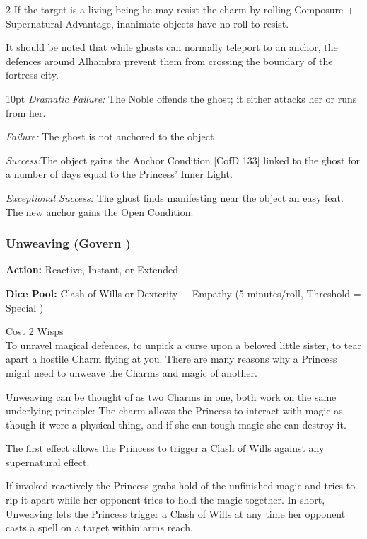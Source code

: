 \begin{multicols}{2}
If the target is a living being he may resist the charm by rolling Composure + Supernatural Advantage, inanimate objects have no roll to resist. 

It should be noted that while ghosts can normally teleport to an anchor, the defences around Alhambra prevent them from crossing the boundary of the fortress city.


\begin{myindentpar}{10pt} \emph{Dramatic Failure:} The Noble offends the ghost; it either attacks her or runs from her.

\emph{Failure:} The ghost is not anchored to the object

\emph{Success:}The object gains the Anchor Condition [CofD 133] linked to the ghost for a number of days equal to the Princess’ Inner Light.

\emph{Exceptional Success:}	 The ghost finds manifesting near the object an easy feat. The new anchor gains the Open Condition.

\end{myindentpar}

\subsubsection*{Unweaving (Govern \textbullet\textbullet\textbullet\textbullet)}

\noindent \textbf{Action:} Reactive, Instant, or Extended

\noindent \textbf{Dice Pool:} Clash of Wills or Dexterity + Empathy (5 minutes/roll, Threshold = Special )

\noindent Cost 2 Wisps\\

To unravel magical defences, to unpick a curse upon a beloved little sister, to tear apart a hostile Charm flying at you. There are many reasons why a Princess might need to unweave the Charms and magic of another. 

Unweaving can be thought of as two Charms in one, both work on the same underlying principle: The charm allows the Princess to interact with magic as though it were a physical thing, and if she can tough magic she can destroy it.

The first effect allows the Princess to trigger a Clash of Wills against any supernatural effect. 

If invoked reactively the Princess grabs hold of the unfinished magic and tries to rip it apart while her opponent tries to hold the magic together. In short, Unweaving lets the Princess trigger a Clash of Wills at any time her opponent casts a spell on a target within arms reach.


\end{multicols}
